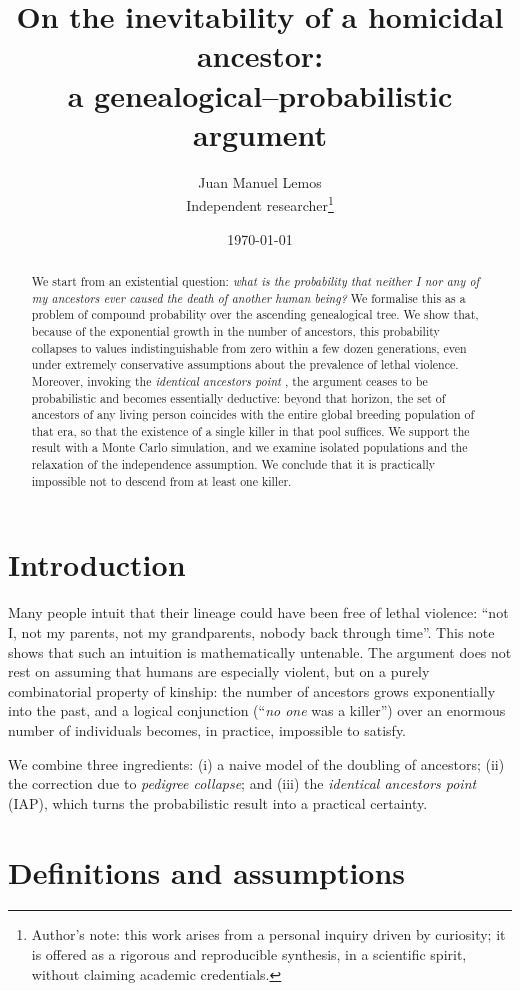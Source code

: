 \documentclass[11pt]{article}
\title{\textbf{On the inevitability of a homicidal ancestor:\\
a genealogical--probabilistic argument}}
\author{Juan Manuel Lemos\\
\normalsize Independent researcher\thanks{Author's note: this work arises from a
personal inquiry driven by curiosity; it is offered as a rigorous and
reproducible synthesis, in a scientific spirit, without claiming academic
credentials.}}
\date{\today}
\begin{document}
\maketitle

\begin{abstract}
\noindent We start from an existential question: \emph{what is the probability
that neither I nor any of my ancestors ever caused the death of another human
being?} We formalise this as a problem of compound probability over the
ascending genealogical tree. We show that, because of the exponential growth in
the number of ancestors, this probability collapses to values indistinguishable
from zero within a few dozen generations, even under extremely conservative
assumptions about the prevalence of lethal violence. Moreover, invoking the
\emph{identical ancestors point} \citep{rohde2004}, the argument ceases to be
probabilistic and becomes essentially deductive: beyond that horizon, the set of
ancestors of any living person coincides with the entire global breeding
population of that era, so that the existence of a single killer in that pool
suffices. We support the result with a Monte Carlo simulation, and we examine
isolated populations and the relaxation of the independence assumption. We
conclude that it is practically impossible not to descend from at least one
killer.
\end{abstract}

\section{Introduction}

Many people intuit that their lineage could have been free of lethal violence:
``not I, not my parents, not my grandparents, nobody back through time''. This
note shows that such an intuition is mathematically untenable. The argument does
not rest on assuming that humans are especially violent, but on a purely
combinatorial property of kinship: the number of ancestors grows exponentially
into the past, and a logical conjunction (``\emph{no one} was a killer'') over an
enormous number of individuals becomes, in practice, impossible to satisfy.

We combine three ingredients: (i) a naive model of the doubling of ancestors;
(ii) the correction due to \emph{pedigree collapse}; and (iii) the
\emph{identical ancestors point} (IAP), which turns the probabilistic result
into a practical certainty.

\section{Definitions and assumptions}\label{sec:def}
\end{document}
